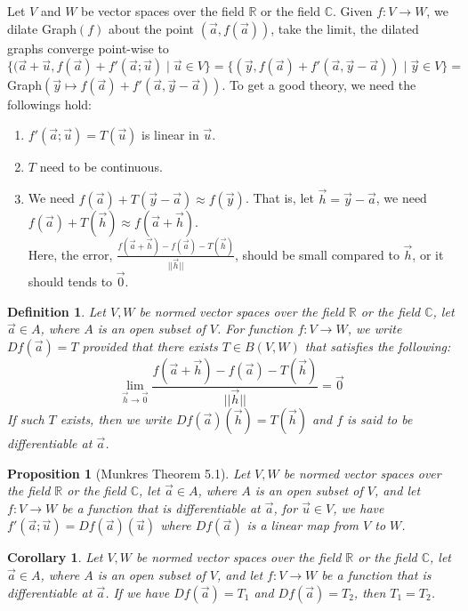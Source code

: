 \documentclass[11pt,oneside]{book}
\theoremstyle{break}
\theoremstyle{break}
\newtheorem{prop}[lem]{Proposition}
\newtheorem{corT}[lem]{Corollary}
\newtheorem{defn}{Definition}[corL]
\newcommand{\R}{\mathbb{R}}
\newcommand{\Complex}{\mathbb{C}}
\begin{document}
Let $V$ and $W$ be vector spaces over the field $\R$ or the field $\Complex$. Given $f:V \to W$, we dilate Graph$(f)$ about the point $(\vec{a},f(\vec{a}))$, take the limit, the dilated graphs converge point-wise to $\{(\vec{a}+\vec{u},f(\vec{a})+f'(\vec{a};\vec{u})\mid \vec{u}\in V\} = \{(\vec{y}, f(\vec{a})+f'(\vec{a},\vec{y}-\vec{a}))\mid \vec{y}\in V\} =\ $Graph$(\vec{y}\mapsto f(\vec{a})+f'(\vec{a},\vec{y}-\vec{a}))$. To get a good theory, we need the followings hold: 
\begin{enumerate}[topsep=3pt,itemsep=-1ex,partopsep=1ex,parsep=1ex]
\item $f'(\vec{a};\vec{u}) = T(\vec{u})$ is linear in $\vec{u}$.
\item $T$ need to be continuous.
\item We need $f(\vec{a}) + T(\vec{y}-\vec{a}) \approx f(\vec{y})$. That is, let $\vec{h} = \vec{y}-\vec{a}$, we need $f(\vec{a})+T(\vec{h}) \approx f(\vec{a}+\vec{h})$. \\Here, the error, $\frac{f(\vec{a}+\vec{h}) - f(\vec{a}) - T(\vec{h})}{||\vec{h}||}$, should be small compared to $\vec{h}$, or it should tends to $\vec{0}$.
\end{enumerate}




\begin{defn}
Let $V,W$ be normed vector spaces over the field $\R$ or the field $\Complex$, let $\vec{a}\in A$, where $A$ is an open subset of $V$. For function $f:V \to W$, we write $Df(\vec{a}) = T$ provided that there exists $T \in B(V,W)$ that satisfies the following: $$\lim_{\vec{h}\to \vec{0}} \frac{f(\vec{a}+\vec{h})-f(\vec{a})-T(\vec{h})}{||\vec{h}||} = \vec{0}$$If such $T$ exists, then we write $Df(\vec{a})(\vec{h})=T(\vec{h})$ and $f$ is said to be differentiable at $\vec{a}$.
\end{defn}


\begin{prop}[Munkres Theorem 5.1]
Let $V,W$ be normed vector spaces over the field $\R$ or the field $\Complex$, let $\vec{a}\in A$, where $A$ is an open subset of $V$, and let $f:V \to W$ be a function that is differentiable at $\vec{a}$, for $\vec{u}\in V$, we have $f'(\vec{a};\vec{u}) = Df(\vec{a})(\vec{u})$ where $Df(\vec{a})$ is a linear map from $V$ to $W$.
\end{prop}


\begin{corT}
Let $V,W$ be normed vector spaces over the field $\R$ or the field $\Complex$, let $\vec{a}\in A$, where $A$ is an open subset of $V$, and let $f:V \to W$ be a function that is differentiable at $\vec{a}$. If we have $Df(\vec{a}) = T_1$ and $Df(\vec{a}) = T_2$, then $T_1 = T_2$.
\end{corT}
\end{document}
